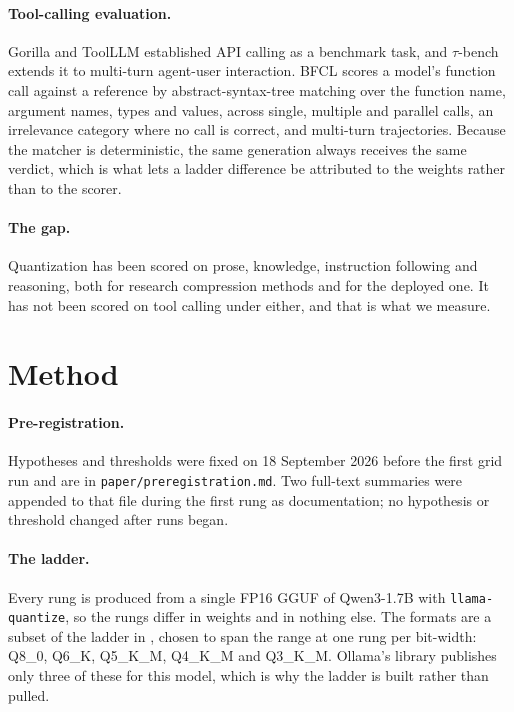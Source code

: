 \documentclass[11pt]{article}
\newcommand{\bfcl}{BFCL}
\newcommand{\qm}{Qwen3-1.7B}
\begin{document}
\paragraph{Tool-calling evaluation.} Gorilla \citep{patil2023gorilla} and ToolLLM \citep{qin2023toolllm} established API calling as a benchmark task, and $\tau$-bench \citep{yao2024taubench} extends it to multi-turn agent-user interaction. \bfcl{} \citep{bfcl2025} scores a model's function call against a reference by abstract-syntax-tree matching over the function name, argument names, types and values, across single, multiple and parallel calls, an irrelevance category where no call is correct, and multi-turn trajectories. Because the matcher is deterministic, the same generation always receives the same verdict, which is what lets a ladder difference be attributed to the weights rather than to the scorer.

\paragraph{The gap.} Quantization has been scored on prose, knowledge, instruction following and reasoning, both for research compression methods and for the deployed one. It has not been scored on tool calling under either, and that is what we measure.

\section{Method}
\label{sec:method}

\paragraph{Pre-registration.} Hypotheses and thresholds were fixed on 18 September 2026 before the first grid run and are in \texttt{paper/preregistration.md}. Two full-text summaries were appended to that file during the first rung as documentation; no hypothesis or threshold changed after runs began.

\paragraph{The ladder.} Every rung is produced from a single FP16 GGUF of \qm{} \citep{qwen3} with \texttt{llama-quantize}, so the rungs differ in weights and in nothing else. The formats are a subset of the ladder in \citet{kurt2026quant}, chosen to span the range at one rung per bit-width: Q8\_0, Q6\_K, Q5\_K\_M, Q4\_K\_M and Q3\_K\_M. Ollama's library publishes only three of these for this model, which is why the ladder is built rather than pulled.
\end{document}
